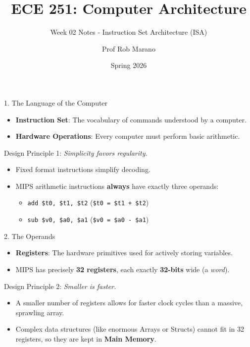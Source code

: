 \documentclass[aspectratio=169]{beamer}
\title{ECE 251: Computer Architecture}
\subtitle{Week 02 Notes - Instruction Set Architecture (ISA)}
\author{Prof Rob Marano}
\date{Spring 2026}
\begin{document}
\frame{\titlepage}

\begin{frame}{1. The Language of the Computer}
\begin{itemize}
    \item \textbf{Instruction Set}: The vocabulary of commands understood by a computer.
    \item \textbf{Hardware Operations}: Every computer must perform basic arithmetic.
\end{itemize}
\begin{block}{Design Principle 1:}
\textit{Simplicity favors regularity.}
\end{block}
\begin{itemize}
    \item Fixed format instructions simplify decoding.
    \item MIPS arithmetic instructions \textbf{always} have exactly three operands:
    \begin{itemize}
        \item \texttt{add \$t0, \$t1, \$t2}  \hspace{1cm} (\texttt{\$t0 = \$t1 + \$t2})
        \item \texttt{sub \$v0, \$a0, \$a1}  \hspace{1cm} (\texttt{\$v0 = \$a0 - \$a1})
    \end{itemize}
\end{itemize}
\end{frame}

\begin{frame}{2. The Operands}
\begin{itemize}
    \item \textbf{Registers}: The hardware primitives used for actively storing variables.
    \item MIPS has precisely \textbf{32 registers}, each exactly \textbf{32-bits} wide (a \textit{word}).
\end{itemize}
\begin{block}{Design Principle 2:}
\textit{Smaller is faster.}
\end{block}
\begin{itemize}
    \item A smaller number of registers allows for faster clock cycles than a massive, sprawling array.
    \item Complex data structures (like enormous Arrays or Structs) cannot fit in 32 registers, so they are kept in \textbf{Main Memory}.
\end{itemize}
\end{frame}
\end{document}
